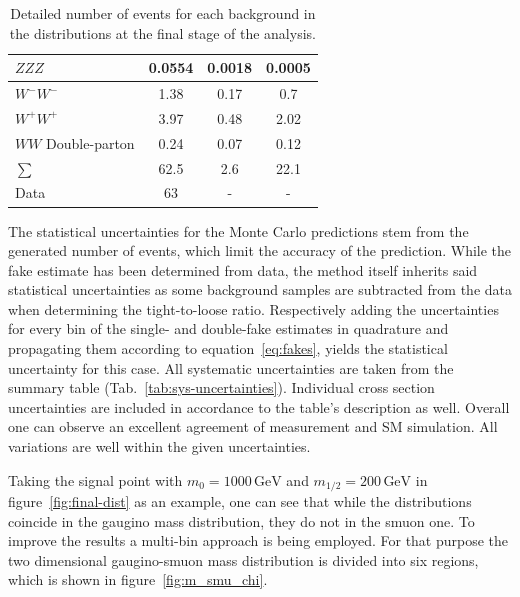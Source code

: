 \begin{table}[!htb]
\begin{tabular}{|l|c|c|c|}
    $ZZZ$                           & 0.0554                               & 0.0018 & 0.0005                     \\ \hline
    $W^- W^-$                       & 1.38                                 & 0.17   & 0.7                        \\
    $W^+ W^+$                       & 3.97                                 & 0.48   & 2.02                       \\
    $WW$ Double-parton              & 0.24                                 & 0.07   & 0.12                       \\ \hline
    $\sum$                          & 62.5                                 & 2.6    & 22.1                       \\ \hline
    Data                            & 63                                   & -      & -                          \\ \hline
  \end{tabular}
  \caption{Detailed number of events for each background in the distributions at the final stage of the analysis.}
  \label{tab:nev-msmuon}
\end{table}

The statistical uncertainties for the Monte Carlo predictions stem from the generated number of events, which limit the accuracy of the prediction. While the fake estimate has been determined from data, the method itself inherits said statistical uncertainties as some background samples are subtracted from the data when determining the tight-to-loose ratio. Respectively adding the uncertainties for every bin of the single- and double-fake estimates in quadrature and propagating them according to equation~\eqref{eq:fakes}, yields the statistical uncertainty for this case. All systematic uncertainties are taken from the summary table (Tab.~\ref{tab:sys-uncertainties}). Individual cross section uncertainties are included in accordance to the table's description as well. Overall one can observe an excellent agreement of measurement and SM simulation. All variations are well within the given uncertainties.

Taking the signal point with $m_0 = 1000\,\text{GeV}$ and $m_{1/2} = 200\,\text{GeV}$ in figure~\ref{fig:final-dist} as an example, one can see that while the distributions coincide in the gaugino mass distribution, they do not in the smuon one. To improve the results a multi-bin approach is being employed. For that purpose the two dimensional gaugino-smuon mass distribution is divided into six regions, which is shown in figure~\ref{fig:m_smu_chi}.

